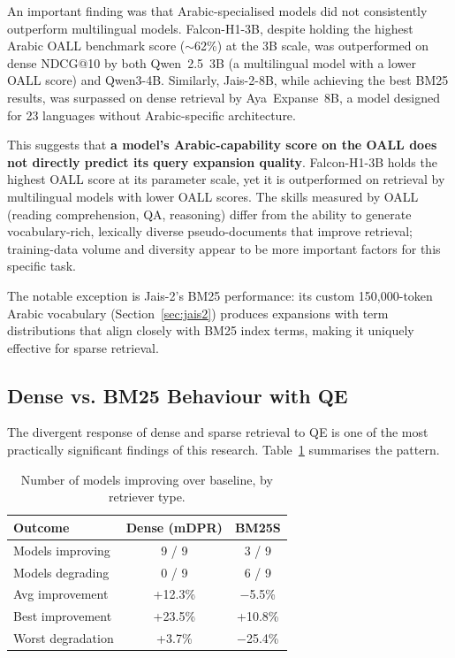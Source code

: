 An important finding was that Arabic-specialised models did not consistently outperform multilingual models. Falcon-H1-3B, despite holding the highest Arabic OALL benchmark score ($\sim$62\%) at the 3B scale, was outperformed on dense NDCG@10 by both Qwen~2.5~3B (a multilingual model with a lower OALL score) and Qwen3-4B. Similarly, Jais-2-8B, while achieving the best BM25 results, was surpassed on dense retrieval by Aya~Expanse~8B, a model designed for 23 languages without Arabic-specific architecture.

This suggests that \textbf{a model's Arabic-capability score on the OALL does not directly predict its query expansion quality}. Falcon-H1-3B holds the highest OALL score at its parameter scale, yet it is outperformed on retrieval by multilingual models with lower OALL scores. The skills measured by OALL (reading comprehension, QA, reasoning) differ from the ability to generate vocabulary-rich, lexically diverse pseudo-documents that improve retrieval; training-data volume and diversity appear to be more important factors for this specific task.

The notable exception is Jais-2's BM25 performance: its custom 150,000-token Arabic vocabulary (Section~\ref{sec:jais2}) produces expansions with term distributions that align closely with BM25 index terms, making it uniquely effective for sparse retrieval.

\subsection{Dense vs. BM25 Behaviour with QE}
\label{sec:res_finding_retriever}

The divergent response of dense and sparse retrieval to QE is one of the most practically significant findings of this research. Table~\ref{tab:retriever_divergence} summarises the pattern.

\begin{table}[htbp]
    \centering
    \caption[Models improving over baseline, by retriever]{Number of models improving over baseline, by retriever type.}
    \label{tab:retriever_divergence}
    \begin{tabular}{@{}lcc@{}}
        \toprule
        \textbf{Outcome} & \textbf{Dense (mDPR)} & \textbf{BM25S} \\
        \midrule
        Models improving & 9 / 9 & 3 / 9 \\
        Models degrading & 0 / 9 & 6 / 9 \\
        Avg improvement & +12.3\% & $-$5.5\% \\
        Best improvement & +23.5\% & +10.8\% \\
        Worst degradation & +3.7\% & $-$25.4\% \\
        \bottomrule
    \end{tabular}
\end{table}

